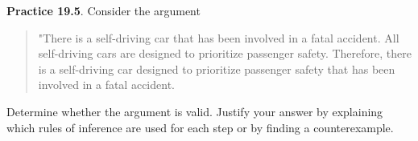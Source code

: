 \documentclass[aspectratio=169]{beamer}
\providecommand{\Blue}[1]{\textcolor{blue}{#1}}
\begin{document}
\begin{frame}[plain]{}

 {\bf Practice 19.5}. Consider the argument
 \begin{quote}
 "There is a self-driving car that has been involved in a fatal accident.
 All self-driving cars are designed to prioritize passenger safety.
 Therefore, there is a self-driving car designed to prioritize passenger safety that has been involved in a fatal accident.
\end{quote}
Determine whether the argument is valid.
 Justify your answer by
   explaining which rules of inference are used for each step or by
   finding a counterexample.

\vspace{1.5in}
  
\end{frame}


\iffalse %
\begin{frame}[plain]{}

\textcolor{blue}{Solution}. 
Let \(\text{SDC}(x)\) mean "x is a self-driving car," \(\text{FA}(x)\) mean "x has been involved in a fatal accident," and \(\text{PS}(x)\) mean "x is designed to prioritize passenger safety." Then, the premises are 
\Blue{
$
\exists x (\text{SDC}(x) \land \text{FA}(x)) \quad \text{and} \quad \forall x (\text{SDC}(x) \rightarrow \text{PS}(x)).
$
}
The conclusion is
\Blue{
$
\exists x (\text{PS}(x) \land \text{FA}(x)).
$
}

\[
\begin{array}{lll}
1. & \exists x (\text{SDC}(x) \land \text{FA}(x)) & \text{Premise} \\
2. & \forall x (\text{SDC}(x) \rightarrow \text{PS}(x)) & \text{Premise} \\
3. & \text{Let } a \text{ be such that } \text{SDC}(a) \land \text{FA}(a) & \text{Existential Instantiation (EI) from 1} \\
4. & \text{SDC}(a) \land \text{FA}(a) & \text{By definition of EI} \\
5. & \text{SDC}(a) & \text{Simplification from 4} \\
6. & \text{FA}(a) & \text{Simplification from 4} \\
7. & \text{SDC}(a) \rightarrow \text{PS}(a) & \text{Universal Instantiation (UI) from 2} \\
8. & \text{PS}(a) & \text{Modus Ponens from 5 and 7} \\
9. & \text{PS}(a) \land \text{FA}(a) & \text{Conjunction from 6 and 8} \\
10. & \exists x (\text{PS}(x) \land \text{FA}(x)) & \text{Existential Generalization (EG) from 9} \\
\end{array}
\]

\end{frame}
\fi%
\end{document}
